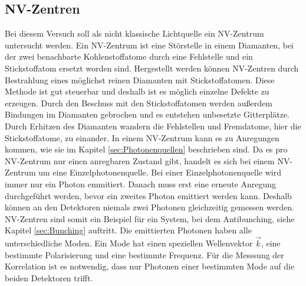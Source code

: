 \subsection{NV-Zentren}
Bei diesem Versuch soll als nicht klassische Lichtquelle ein NV-Zentrum untersucht werden. Ein NV-Zentrum ist eine Störstelle in einem Diamanten, bei der zwei benachbarte Kohlenstoffatome durch eine Fehlstelle und ein Stickstoffatom ersetzt worden sind.  
Hergestellt werden können NV-Zentren durch Bestrahlung eines möglichst reinen Diamanten mit Stickstoffatomen. Diese Methode ist gut steuerbar und deshalb ist es möglich einzelne Defekte zu erzeugen. Durch den Beschuss mit den Stickstoffatomen werden außerdem Bindungen im Diamanten gebrochen und es entstehen unbesetzte Gitterplätze. Durch Erhitzen des Diamanten wandern die Fehlstellen und Fremdatome, hier die Stickstoffatome, zu einander.  
In einem NV-Zentrum kann es zu Anregungen kommen, wie sie im Kapitel \ref{sec:Photonenquellen} beschrieben sind. Da es pro NV-Zentrum nur einen anregbaren Zustand gibt, handelt es sich bei einem NV-Zentrum um eine Einzelphotonenquelle.   Bei einer Einzelphotonenquelle wird immer nur ein Photon emmitiert. Danach muss erst eine erneute Anregung durchgeführt werden, bevor ein zweites Photon emittiert werden kann. Deshalb können an den Detektoren niemals zwei Photonen gleichzeitig gemessen werden. NV-Zentren sind somit ein Beispiel für ein System, bei dem Antibunching, siehe Kapitel \ref{sec:Bunching}  auftritt.  
Die emittierten Photonen haben alle unterschiedliche Moden. Ein Mode hat  einen speziellen Wellenvektor $\vec{k}$, eine bestimmte Polarisierung und eine bestimmte Frequenz. Für die Messsung der Korrelation ist es notwendig, dass nur Photonen einer bestimmten Mode  auf die beiden Detektoren trifft.




